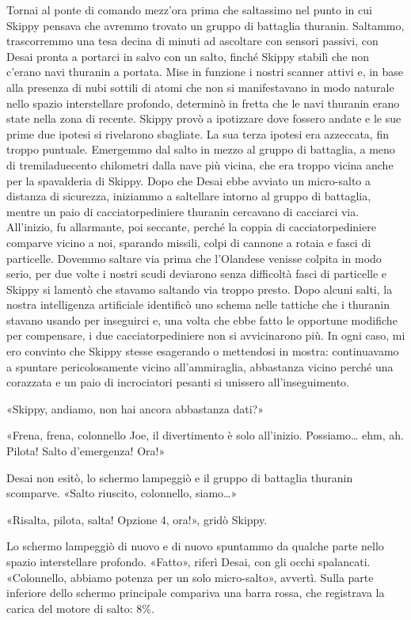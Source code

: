 Tornai al ponte di comando mezz'ora prima che saltassimo nel punto in
cui Skippy pensava che avremmo trovato un gruppo di battaglia thuranin.
Saltammo, trascorremmo una tesa decina di minuti ad ascoltare con
sensori passivi, con Desai pronta a portarci in salvo con un salto,
finché Skippy stabilì che non c'erano navi thuranin a portata. Mise in
funzione i nostri scanner attivi e, in base alla presenza di nubi
sottili di atomi che non si manifestavano in modo naturale nello spazio
interstellare profondo, determinò in fretta che le navi thuranin erano
state nella zona di recente. Skippy provò a ipotizzare dove fossero
andate e le sue prime due ipotesi si rivelarono sbagliate. La sua terza
ipotesi era azzeccata, fin troppo puntuale. Emergemmo dal salto in mezzo
al gruppo di battaglia, a meno di tremiladuecento chilometri dalla nave
più vicina, che era troppo vicina anche per la spavalderia di Skippy.
Dopo che Desai ebbe avviato un micro-salto a distanza di sicurezza,
iniziammo a saltellare intorno al gruppo di battaglia, mentre un paio di
cacciatorpediniere thuranin cercavano di cacciarci via. All'inizio, fu
allarmante, poi seccante, perché la coppia di cacciatorpediniere
comparve vicino a noi, sparando missili, colpi di cannone a rotaia e
fasci di particelle. Dovemmo saltare via prima che l'Olandese venisse
colpita in modo serio, per due volte i nostri scudi deviarono senza
difficoltà fasci di particelle e Skippy si lamentò che stavamo saltando
via troppo presto. Dopo alcuni salti, la nostra intelligenza artificiale
identificò uno schema nelle tattiche che i thuranin stavano usando per
inseguirci e, una volta che ebbe fatto le opportune modifiche per
compensare, i due cacciatorpediniere non si avvicinarono più. In ogni
caso, mi ero convinto che Skippy stesse esagerando o mettendosi in
mostra: continuavamo a spuntare pericolosamente vicino all'ammiraglia,
abbastanza vicino perché una corazzata e un paio di incrociatori pesanti
si unissero all'inseguimento.

«Skippy, andiamo, non hai ancora abbastanza dati?»

«Frena, frena, colonnello Joe, il divertimento è solo all'inizio.
Possiamo\ldots{} ehm, ah. Pilota! Salto d'emergenza! Ora!»

Desai non esitò, lo schermo lampeggiò e il gruppo di battaglia thuranin
scomparve. «Salto riuscito, colonnello, siamo\ldots»

«Risalta, pilota, salta! Opzione 4, ora!», gridò Skippy.

Lo schermo lampeggiò di nuovo e di nuovo spuntammo da qualche parte
nello spazio interstellare profondo. «Fatto», riferì Desai, con gli
occhi spalancati. «Colonnello, abbiamo potenza per un solo micro-salto»,
avvertì. Sulla parte inferiore dello schermo principale compariva una
barra rossa, che registrava la carica del motore di salto: 8\%.

